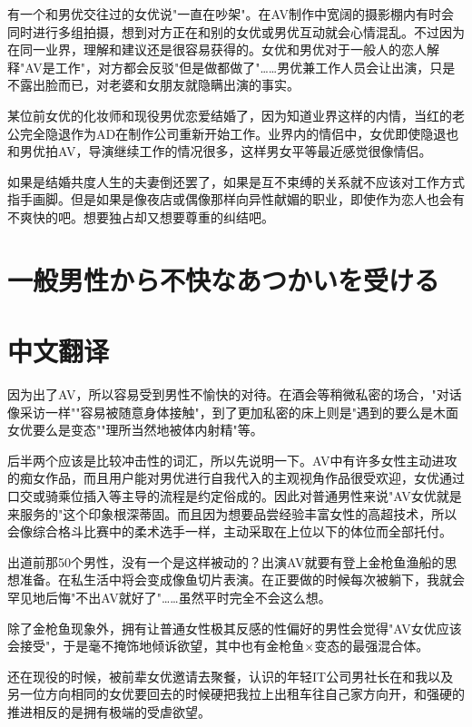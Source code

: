 \documentclass[12pt,UTF8]{ctexbook}
\begin{document}
有一个和男优交往过的女优说"一直在吵架"。在AV制作中宽阔的摄影棚内有时会同时进行多组拍摄，想到对方正在和别的女优或男优互动就会心情混乱。不过因为在同一业界，理解和建议还是很容易获得的。女优和男优对于一般人的恋人解释"AV是工作"，对方都会反驳"但是做都做了"……男优兼工作人员会让出演，只是不露出脸而已，对老婆和女朋友就隐瞒出演的事实。

某位前女优的化妆师和现役男优恋爱结婚了，因为知道业界这样的内情，当红的老公完全隐退作为AD在制作公司重新开始工作。业界内的情侣中，女优即使隐退也和男优拍AV，导演继续工作的情况很多，这样男女平等最近感觉很像情侣。

如果是结婚共度人生的夫妻倒还罢了，如果是互不束缚的关系就不应该对工作方式指手画脚。但是如果是像夜店或偶像那样向异性献媚的职业，即使作为恋人也会有不爽快的吧。想要独占却又想要尊重的纠结吧。

\switchcolumn

\section{一般男性から不快なあつかいを受ける}

\switchcolumn

\section*{中文翻译}

因为出了AV，所以容易受到男性不愉快的对待。在酒会等稍微私密的场合，"对话像采访一样""容易被随意身体接触"，到了更加私密的床上则是"遇到的要么是木面女优要么是变态""理所当然地被体内射精"等。

后半两个应该是比较冲击性的词汇，所以先说明一下。AV中有许多女性主动进攻的痴女作品，而且用户能对男优进行自我代入的主观视角作品很受欢迎，女优通过口交或骑乘位插入等主导的流程是约定俗成的。因此对普通男性来说"AV女优就是来服务的"这个印象根深蒂固。而且因为想要品尝经验丰富女性的高超技术，所以会像综合格斗比赛中的柔术选手一样，主动采取在上位以下的体位而全部托付。

出道前那50个男性，没有一个是这样被动的？出演AV就要有登上金枪鱼渔船的思想准备。在私生活中将会变成像鱼切片表演。在正要做的时候每次被躺下，我就会罕见地后悔"不出AV就好了"……虽然平时完全不会这么想。

除了金枪鱼现象外，拥有让普通女性极其反感的性偏好的男性会觉得"AV女优应该会接受"，于是毫不掩饰地倾诉欲望，其中也有金枪鱼×变态的最强混合体。

还在现役的时候，被前辈女优邀请去聚餐，认识的年轻IT公司男社长在和我以及另一位方向相同的女优要回去的时候硬把我拉上出租车往自己家方向开，和强硬的推进相反的是拥有极端的受虐欲望。
\end{document}
